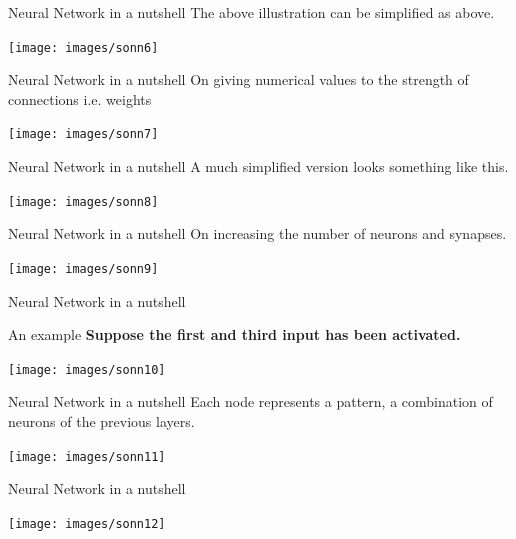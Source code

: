 \documentclass[10pt]{beamer}
\begin{document}
	\begin{frame}[c]{Neural Network in a nutshell}
		\large{The above illustration can be simplified as above.}
			\begin{center}
				\texttt{[image: images/sonn6]}
			\end{center}
	\end{frame}
	\begin{frame}[c]{Neural Network in a nutshell}
		\large{On giving numerical values to the strength of connections i.e. weights}
			\begin{center}
				\texttt{[image: images/sonn7]}
			\end{center}
	\end{frame}
	\begin{frame}[c]{Neural Network in a nutshell}
		\large{A much simplified version looks something like this.}
		\begin{center}
			\texttt{[image: images/sonn8]}
		\end{center}
	\end{frame}
	\begin{frame}[c]{Neural Network in a nutshell}
		\large{On increasing the number of neurons and synapses.}
		\begin{center}
			\texttt{[image: images/sonn9]}
		\end{center}
	\end{frame}
	\begin{frame}[c]{Neural Network in a nutshell}
		\begin{block}{An example}
			\textbf{Suppose the first and third input has been activated.}
			\begin{center}
			\texttt{[image: images/sonn10]}
			\end{center}
		\end{block}
	\end{frame}
	\begin{frame}[c]{Neural Network in a nutshell}
		\large{Each node represents a pattern, a combination of neurons of the previous layers.}
		\begin{center}
			\texttt{[image: images/sonn11]}
		\end{center}
	\end{frame}
	\begin{frame}[c]{Neural Network in a nutshell}
		\begin{center}
			\texttt{[image: images/sonn12]}
		\end{center}
	\end{frame}
\end{document}
